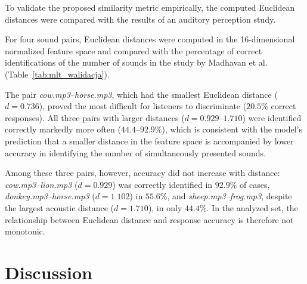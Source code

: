 \documentclass[doubleblind,preprint,12pt]{elsarticle}
\begin{document}
To validate the proposed similarity metric empirically, the computed Euclidean distances were compared with the results of an auditory perception study.

For four sound pairs, Euclidean distances were computed in the 16-dimensional normalized feature space and compared with the percentage of correct identifications of the number of sounds in the study by Madhavan et al.~\cite{MadhavanWrobel2024MLT} (Table~\ref{tab:mlt_walidacja}).

\begin{table}[H]
\centering
{}
\caption{Euclidean distances between pairs of auditory stimuli compared with the percentage of correct responses in the two-item trials of the MLT study~\cite{MadhavanWrobel2024MLT}.}
\label{tab:mlt_walidacja}
\end{table}

The pair \textit{cow.mp3--horse.mp3}, which had the smallest Euclidean distance ($d = 0.736$), proved the most difficult for listeners to discriminate ($20.5\%$ correct responses). All three pairs with larger distances ($d = 0.929$--$1.710$) were identified correctly markedly more often ($44.4$--$92.9\%$), which is consistent with the model's prediction that a smaller distance in the feature space is accompanied by lower accuracy in identifying the number of simultaneously presented sounds.

Among these three pairs, however, accuracy did not increase with distance: \textit{cow.mp3--lion.mp3} ($d = 0.929$) was correctly identified in $92.9\%$ of cases, \textit{donkey.mp3--horse.mp3} ($d = 1.102$) in $55.6\%$, and \textit{sheep.mp3--frog.mp3}, despite the largest acoustic distance ($d = 1.710$), in only $44.4\%$. In the analyzed set, the relationship between Euclidean distance and response accuracy is therefore not monotonic.



\section{Discussion}
\end{document}
